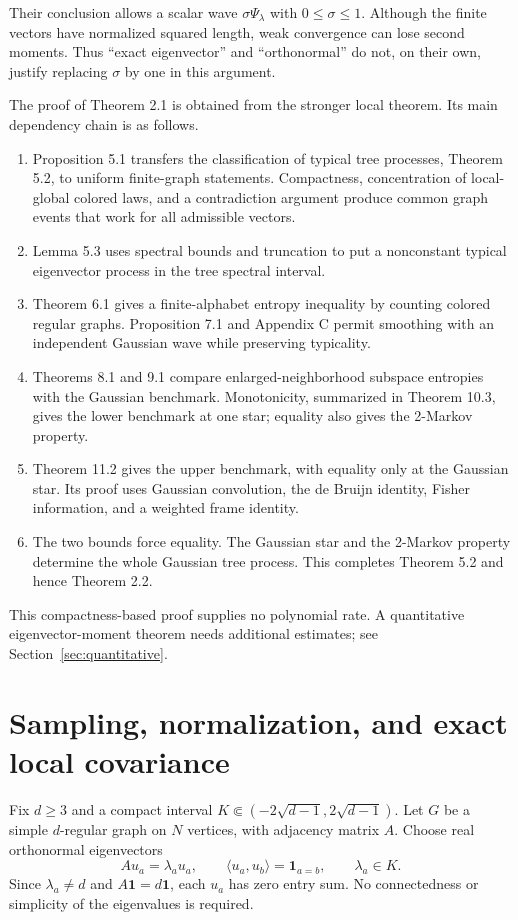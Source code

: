 \documentclass[11pt]{article}
\numberwithin{equation}{section}
\theoremstyle{definition}
\theoremstyle{remark}
\newcommand{\one}{\mathbf 1}
\begin{document}
Their conclusion allows a scalar wave $\sigma\Psi_\lambda$ with
$0\leq\sigma\leq1$. Although the finite vectors have normalized squared
length, weak convergence can lose second moments. Thus ``exact
eigenvector'' and ``orthonormal'' do not, on their own, justify replacing
$\sigma$ by one in this argument.

The proof of Theorem 2.1 is obtained from the stronger local theorem.
Its main dependency chain is as follows.
\begin{enumerate}
\item Proposition 5.1 transfers the classification of typical tree
processes, Theorem 5.2, to uniform finite-graph statements. Compactness,
concentration of local-global colored laws, and a contradiction argument
produce common graph events that work for all admissible vectors.
\item Lemma 5.3 uses spectral bounds and truncation to put a nonconstant
typical eigenvector process in the tree spectral interval.
\item Theorem 6.1 gives a finite-alphabet entropy inequality by counting
colored regular graphs. Proposition 7.1 and Appendix C permit smoothing
with an independent Gaussian wave while preserving typicality.
\item Theorems 8.1 and 9.1 compare enlarged-neighborhood subspace
entropies with the Gaussian benchmark. Monotonicity, summarized in
Theorem 10.3, gives the lower benchmark at one star; equality also gives
the 2-Markov property.
\item Theorem 11.2 gives the upper benchmark, with equality only at the
Gaussian star. Its proof uses Gaussian convolution, the de Bruijn
identity, Fisher information, and a weighted frame identity.
\item The two bounds force equality. The Gaussian star and the
2-Markov property determine the whole Gaussian tree process. This
completes Theorem 5.2 and hence Theorem 2.2.
\end{enumerate}
This compactness-based proof supplies no polynomial rate. A quantitative
eigenvector-moment theorem needs additional estimates; see
Section~\ref{sec:quantitative}.

\section{Sampling, normalization, and exact local covariance}
Fix $d\geq3$ and a compact interval
$K\Subset(-2\sqrt{d-1},2\sqrt{d-1})$. Let $G$ be a simple $d$-regular
graph on $N$ vertices, with adjacency matrix $A$. Choose real
orthonormal eigenvectors
\[
 Au_a=\lambda_a u_a,\qquad
 \langle u_a,u_b\rangle=\one_{a=b},\qquad \lambda_a\in K.
\]
Since $\lambda_a\ne d$ and $A\one=d\one$, each $u_a$ has zero entry sum.
No connectedness or simplicity of the eigenvalues is required.
\end{document}
